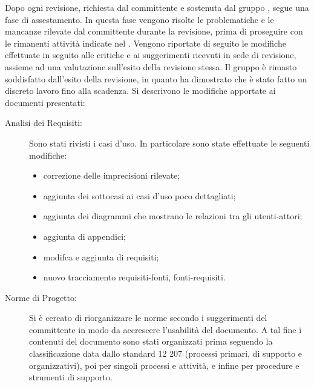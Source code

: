 Dopo ogni revisione, richiesta dal committente e sostenuta dal gruppo \groupname{}, segue una fase di assestamento. In questa fase vengono risolte le problematiche e le mancanze rilevate dal committente durante la revisione, prima di proseguire con le rimanenti attività indicate nel .
Vengono riportate di seguito le modifiche effettuate in seguito alle critiche e ai suggerimenti ricevuti in sede di revisione, assieme ad una valutazione sull'esito della revisione stessa.
Il gruppo è rimasto soddisfatto dall'esito della revisione, in quanto ha dimostrato che è stato fatto un discreto lavoro fino alla scadenza.
Si descrivono le modifiche apportate ai documenti presentati:
\begin{description}
\item[Analisi dei Requisiti:] Sono stati rivisti i casi d'uso. In particolare sono state effettuate le seguenti modifiche:
\begin{itemize}
\item correzione delle imprecisioni rilevate;
\item aggiunta dei sottocasi ai casi d'uso poco dettagliati;
\item aggiunta dei diagrammi che mostrano le relazioni tra gli utenti-attori;
\item aggiunta di appendici;
\item modifca e aggiunta di requisiti;
\item nuovo tracciamento requisiti-fonti, fonti-requisiti.
\end{itemize}
\item[Norme di Progetto:] Si è cercato di riorganizzare le norme secondo i suggerimenti del committente in modo da accrescere l'usabilità del documento. A tal fine i contenuti del documento sono stati organizzati prima seguendo la classificazione data dallo standard 12 207 (processi primari, di supporto e organizzativi), poi per singoli processi e attività, e infine per procedure e strumenti di supporto.

\end{description}
